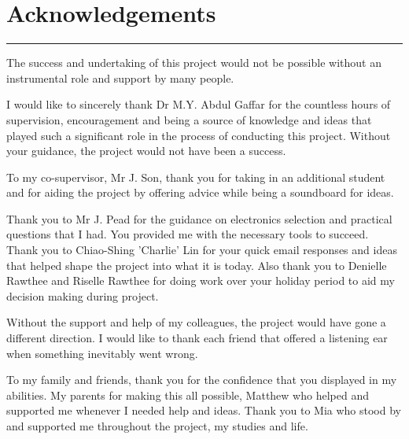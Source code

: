 {\large\chapter*{Acknowledgements}\label{sec:Acknowledgements}}
\hrule

The success and undertaking of this project would not be possible without an instrumental role and support by many people. 

I would like to sincerely thank Dr M.Y. Abdul Gaffar for the countless hours of supervision, encouragement and being a source of knowledge and ideas that played such a significant role in the process of conducting this project. Without your guidance, the project would not have been a success.

To my co-supervisor, Mr J. Son, thank you for taking in an additional student and for aiding the project by offering advice while being a soundboard for ideas.

Thank you to Mr J. Pead for the guidance on electronics selection and practical questions that I had. You provided me with the necessary tools to succeed. Thank you to Chiao-Shing 'Charlie' Lin for your quick email responses and ideas that helped shape the project into what it is today. Also thank you to Denielle Rawthee and Riselle Rawthee for doing work over your holiday period to aid my decision making during project.

Without the support and help of my colleagues, the project would have gone a different direction. I would like to thank each friend that offered a listening ear when something inevitably went wrong.

To my family and friends, thank you for the confidence that you displayed in my abilities. My parents for making this all possible, Matthew who helped and supported me whenever I needed help and ideas. Thank you to Mia who stood by and supported me throughout the project, my studies and life. 







\newpage